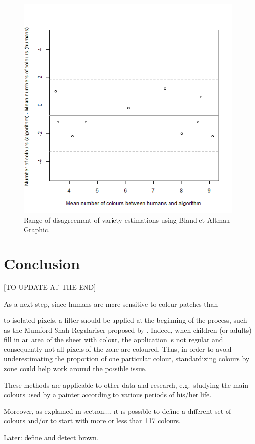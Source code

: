 \documentclass[11pt,a4paper]{article}
\begin{document}
\begin{figure}[h!]
	\centering
	\includegraphics[width=\linewidth]{figures/comp_nb_colours_agreement.png}
	\caption{Range of disagreement of variety estimations using Bland et Altman  Graphic.}
	\label{fig:blandandaltman}
\end{figure}



\section{Conclusion}
\label{sec:conclusion}
{\color{red}[TO UPDATE AT THE END] }
{\color{gray} As a next step, since humans are more sensitive to colour patches than

to isolated pixels, a filter should be applied at the beginning of the
process, such as the Mumford-Shah Regulariser proposed by
\citet{erdem2009}. Indeed, when children (or adults) fill in an area of
the sheet with colour, the application is not regular and consequently
not all pixels of the zone are coloured. Thus, in order to avoid
underestimating the proportion of one particular colour, standardizing
colours by zone could help work around the possible issue.}

These methods are
applicable to other data and research, e.g.~studying the main colours
used by a painter according to various periods of his/her life.

Moreover, as explained in section..., it is possible to define a different set of colours and/or to start with more or less than 117 colours.

Later: define and detect brown.



\end{document}
